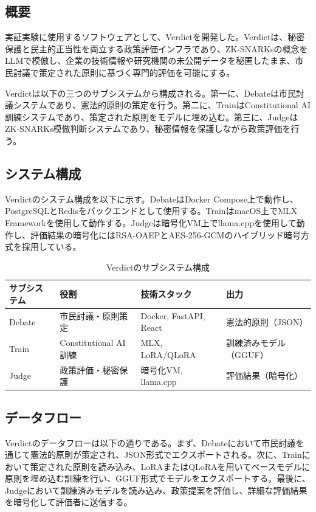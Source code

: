 \subsection{概要}

実証実験に使用するソフトウェアとして、Verdictを開発した。Verdictは、秘密保護と民主的正当性を両立する政策評価インフラであり、ZK-SNARKsの概念をLLMで模倣し、企業の技術情報や研究機関の未公開データを秘匿したまま、市民討議で策定された原則に基づく専門的評価を可能にする。

Verdictは以下の三つのサブシステムから構成される。第一に、Debateは市民討議システムであり、憲法的原則の策定を行う。第二に、TrainはConstitutional AI訓練システムであり、策定された原則をモデルに埋め込む。第三に、JudgeはZK-SNARKs模倣判断システムであり、秘密情報を保護しながら政策評価を行う。

\subsection{システム構成}

Verdictのシステム構成を以下に示す。DebateはDocker Compose上で動作し、PostgreSQLとRedisをバックエンドとして使用する。TrainはmacOS上でMLX Frameworkを使用して動作する。Judgeは暗号化VM上でllama.cppを使用して動作し、評価結果の暗号化にはRSA-OAEPとAES-256-GCMのハイブリッド暗号方式を採用している。

\begin{table}[htbp]
\centering
\caption{Verdictのサブシステム構成}
\label{tab:verdict_subsystems}
\begin{tabular}{llll}
\toprule
サブシステム & 役割 & 技術スタック & 出力 \\
\midrule
Debate & 市民討議・原則策定 & Docker, FastAPI, React & 憲法的原則（JSON） \\
Train & Constitutional AI訓練 & MLX, LoRA/QLoRA & 訓練済みモデル（GGUF） \\
Judge & 政策評価・秘密保護 & 暗号化VM, llama.cpp & 評価結果（暗号化） \\
\bottomrule
\end{tabular}
\end{table}

\subsection{データフロー}

Verdictのデータフローは以下の通りである。まず、Debateにおいて市民討議を通じて憲法的原則が策定され、JSON形式でエクスポートされる。次に、Trainにおいて策定された原則を読み込み、LoRAまたはQLoRAを用いてベースモデルに原則を埋め込む訓練を行い、GGUF形式でモデルをエクスポートする。最後に、Judgeにおいて訓練済みモデルを読み込み、政策提案を評価し、詳細な評価結果を暗号化して評価者に送信する。

